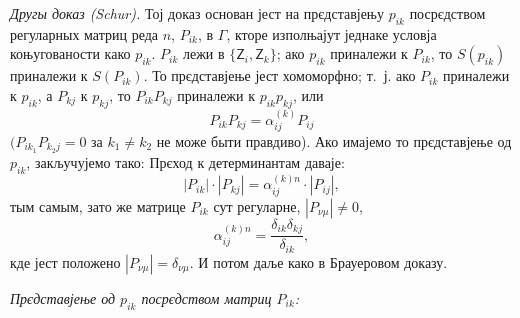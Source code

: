 \documentclass[11pt]{article}
\begin{document}
\emph{Другы доказ (Schur).} Тој доказ основан јест на прєдставјењу \(p_{ik}\) посрєдством регуларных матриц реда \(n\), \(P_{ik}\), в \(\Gamma\), кторе изполњајут једнаке условја коњугованости како \(p_{ik}\). \(P_{ik}\) лежи в \(\{\mathsf{Z}_i,\mathsf{Z}_k\}\); ако \(p_{ik}\) приналежи к \(P_{ik}\), то \(S(p_{ik})\) приналежи к \(S(P_{ik})\). То прєдставјење јест хомоморфно; т.~ј. ако \(P_{ik}\) приналежи к \(p_{ik}\), а \(P_{kj}\) к \(p_{kj}\), то \(P_{ik}P_{kj}\) приналежи к \(p_{ik}p_{kj}\), или
\[
P_{ik}P_{kj}=\alpha_{ij}^{(k)}P_{ij}
\]
\((P_{ik_1}P_{k_2j}=0\) за \(k_1\neq k_2\) не може быти правдиво). Ако имајемо то прєдставјење од \(p_{ik}\), закључујемо тако: Прєход к детерминантам даваје:
\[
|P_{ik}|\cdot |P_{kj}|=\alpha_{ij}^{(k)n}\cdot |P_{ij}|,
\]
тым самым, зато же матрице \(P_{ik}\) сут регуларне, \(|P_{\nu\mu}|\ne0\),
\[
\alpha_{ij}^{(k)n}=\frac{\delta_{ik}\delta_{kj}}{\delta_{ik}},
\]
кде јест положено \(|P_{\nu\mu}|=\delta_{\nu\mu}\). И потом даље како в Брауеровом доказу.

\emph{Прєдставјење од \(p_{ik}\) посрєдством матриц \(P_{ik}\):}
\end{document}
